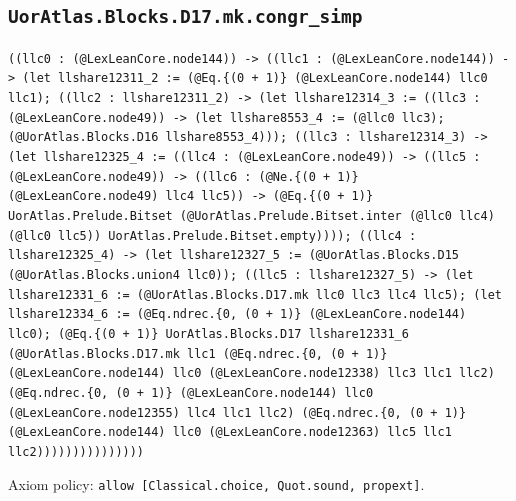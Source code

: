 \documentclass[11pt]{article}
\begin{document}
\subsection*{\texttt{UorAtlas.Blocks.D17.mk.congr\_simp}}
\noindent\texttt{((llc0 : (@LexLeanCore.node144)) -> ((llc1 : (@LexLeanCore.node144)) -> (let llshare12311\_2 := (@Eq.\{(0 + 1)\} (@LexLeanCore.node144) llc0 llc1); ((llc2 : llshare12311\_2) -> (let llshare12314\_3 := ((llc3 : (@LexLeanCore.node49)) -> (let llshare8553\_4 := (@llc0 llc3); (@UorAtlas.Blocks.D16 llshare8553\_4))); ((llc3 : llshare12314\_3) -> (let llshare12325\_4 := ((llc4 : (@LexLeanCore.node49)) -> ((llc5 : (@LexLeanCore.node49)) -> ((llc6 : (@Ne.\{(0 + 1)\} (@LexLeanCore.node49) llc4 llc5)) -> (@Eq.\{(0 + 1)\} UorAtlas.Prelude.Bitset (@UorAtlas.Prelude.Bitset.inter (@llc0 llc4) (@llc0 llc5)) UorAtlas.Prelude.Bitset.empty)))); ((llc4 : llshare12325\_4) -> (let llshare12327\_5 := (@UorAtlas.Blocks.D15 (@UorAtlas.Blocks.union4 llc0)); ((llc5 : llshare12327\_5) -> (let llshare12331\_6 := (@UorAtlas.Blocks.D17.mk llc0 llc3 llc4 llc5); (let llshare12334\_6 := (@Eq.ndrec.\{0, (0 + 1)\} (@LexLeanCore.node144) llc0); (@Eq.\{(0 + 1)\} UorAtlas.Blocks.D17 llshare12331\_6 (@UorAtlas.Blocks.D17.mk llc1 (@Eq.ndrec.\{0, (0 + 1)\} (@LexLeanCore.node144) llc0 (@LexLeanCore.node12338) llc3 llc1 llc2) (@Eq.ndrec.\{0, (0 + 1)\} (@LexLeanCore.node144) llc0 (@LexLeanCore.node12355) llc4 llc1 llc2) (@Eq.ndrec.\{0, (0 + 1)\} (@LexLeanCore.node144) llc0 (@LexLeanCore.node12363) llc5 llc1 llc2)))))))))))))))}\par
\noindent Axiom policy: \texttt{allow [Classical.choice, Quot.sound, propext]}.\par
\end{document}
